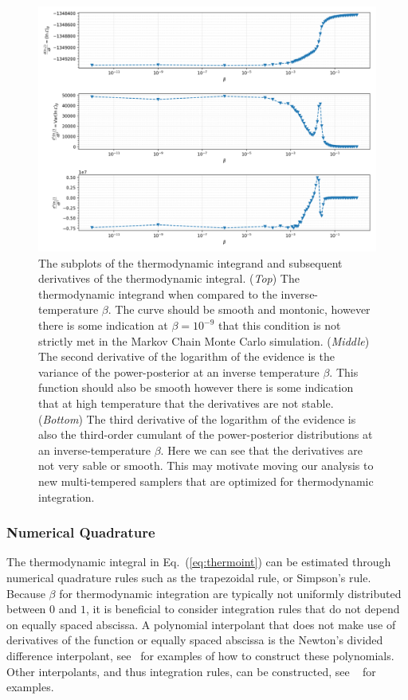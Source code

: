\begin{figure}[th]
\centering
\includegraphics[width=0.9\columnwidth]{figs/chapter6/gooseneck_plots_log.png}
\caption{The subplots of the thermodynamic integrand and subsequent derivatives of the thermodynamic integral. (\textit{Top}) The thermodynamic integrand when compared to the inverse-temperature $\beta$. The curve should be smooth and montonic, however there is some indication at $\beta = 10^{-9}$ that this condition is not strictly met in the Markov Chain Monte Carlo simulation. (\textit{Middle}) The second derivative of the logarithm of the evidence is the variance of the power-posterior at an inverse temperature $\beta$. This function should also be smooth however there is some indication that at high temperature that the derivatives are not stable. (\textit{Bottom}) The third derivative of the logarithm of the evidence is also the third-order cumulant of the power-posterior distributions at an inverse-temperature $\beta$. Here we can see that the derivatives are not very sable or smooth. This may motivate moving our analysis to new multi-tempered samplers that are optimized for thermodynamic integration.}
\label{fig:gooseneck_log}
\end{figure}

\subsubsection{Numerical Quadrature}
The thermodynamic integral in Eq.~(\ref{eq:thermoint}) can be estimated through numerical quadrature rules such as the trapezoidal rule, or Simpson's rule. Because $\beta$ for thermodynamic integration are typically not uniformly distributed between $0$ and $1$, it is beneficial to consider integration rules that do not depend on equally spaced abscissa. A polynomial interpolant that does not make use of derivatives of the function or equally spaced abscissa is the Newton's divided difference interpolant, see~\cite{brun1953generalization, selmer1958numerical, abramowitz1965handbook} for examples of how to construct these polynomials. Other  interpolants, and thus integration rules, can be constructed, see ~\cite{abramowitz1965handbook} for examples.

